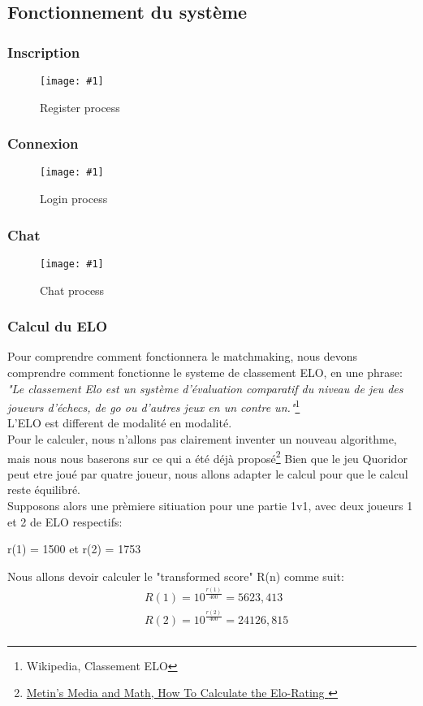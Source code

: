 \documentclass[11pt,a4paper,titlepage]{article}
\newcommand{\addimg}[4]{
    \begin{figure}[H]
        \centering
        \texttt{[image: \#1]}
    \caption{#3}
    \label{#4}
    \end{figure}
}
\begin{document}
    \subsection{Fonctionnement du système}
        \subsubsection{Inscription}
        \addimg{Reg.eps}{width=\linewidth}{Register process}{regSeq}
        \subsubsection{Connexion}
        \addimg{Login.eps}{width=\linewidth}{Login process}{loginSeq}
        \subsubsection{Chat}
        \addimg{ChatSequence.eps}{width=\linewidth}{Chat process}{chatSeq}
        \subsubsection{Calcul du ELO}
        Pour comprendre comment fonctionnera le matchmaking, nous devons comprendre comment fonctionne le systeme de classement ELO, en une phrase:
        \textit{"Le classement Elo est un système d’évaluation comparatif du niveau de jeu des joueurs d’échecs, de go ou d’autres jeux en un contre un."}\footnote{Wikipedia, Classement ELO} \\
        L'ELO est different de modalité en modalité. \\
        Pour le calculer, nous n'allons pas clairement inventer un nouveau algorithme, mais nous nous baserons sur ce qui a été déjà proposé\footnote{\href{https://metinmediamath.wordpress.com/2013/11/27/how-to-calculate-the-elo-rating-including-example/}{Metin's Media and Math, How To Calculate the Elo-Rating }}
        Bien que le jeu Quoridor peut etre joué par quatre joueur, nous allons adapter le calcul pour que le calcul reste équilibré. \\
        Supposons alors une prèmiere sitiuation pour une partie 1v1, avec deux joueurs 1 et 2 de ELO respectifs: 
    \begin{center}
        r(1) = 1500 et r(2) = 1753
    \end{center}
    Nous allons devoir calculer le "transformed score" R(n) comme suit:
    \begin{equation}
        \begin{split}
            & R(1) = 10^{\frac{r(1)}{400}} = 5623,413 \\
            & R(2) = 10^{\frac{r(2)}{400}} = 24126,815 \\
        \end{split}
    \end{equation}
\end{document}
